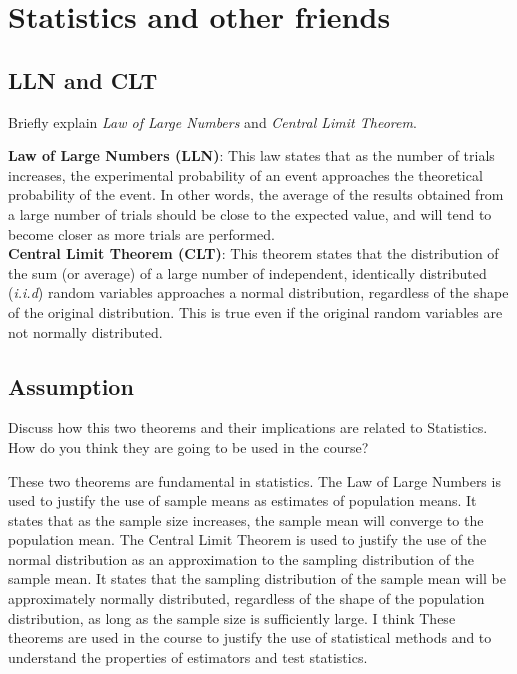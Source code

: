 \section{ Statistics and other friends}
\subsection{LLN and CLT}
Briefly explain \textit{Law of Large Numbers} and \textit{Central Limit Theorem}.
\begin{qsolve}
	\begin{qsolve}[]
		\textbf{Law of Large Numbers (LLN)}: This law states that as the number of trials increases, the experimental probability of an event approaches the theoretical probability of the event. In other words, the average of the results obtained from a large number of trials should be close to the expected value, and will tend to become closer as more trials are performed. \\
		\textbf{Central Limit Theorem (CLT)}: This theorem states that the distribution of the sum (or average) of a large number of independent, identically distributed (\textit{i.i.d}) random variables approaches a normal distribution, regardless of the shape of the original distribution. This is true even if the original random variables are not normally distributed. 
	\end{qsolve}
\end{qsolve}
\subsection{Assumption}
Discuss how this two theorems and their implications are related to Statistics. How do you
think they are going to be used in the course?
\begin{qsolve}
	\begin{qsolve}[]
		These two theorems are fundamental in statistics. The Law of Large Numbers is used to justify the use of sample means as estimates of population means. It states that as the sample size increases, the sample mean will converge to the population mean. The Central Limit Theorem is used to justify the use of the normal distribution as an approximation to the sampling distribution of the sample mean. It states that the sampling distribution of the sample mean will be approximately normally distributed, regardless of the shape of the population distribution, as long as the sample size is sufficiently large. I think These theorems are used in the course to justify the use of statistical methods and to understand the properties of estimators and test statistics. 
	\end{qsolve}
\end{qsolve}
